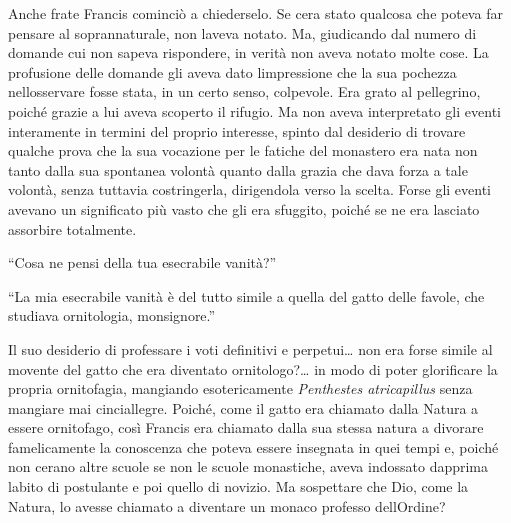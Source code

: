 Anche frate Francis cominciò a chiederselo. Se c\textquotesingle era
stato qualcosa che poteva far pensare al soprannaturale, non
l\textquotesingle aveva notato. Ma, giudicando dal numero di domande cui
non sapeva rispondere, in verità non aveva notato molte cose. La
profusione delle domande gli aveva dato l\textquotesingle impressione
che la sua pochezza nell\textquotesingle osservare fosse stata, in un
certo senso, colpevole. Era grato al pellegrino, poiché grazie a lui
aveva scoperto il rifugio. Ma non aveva interpretato gli eventi
interamente in termini del proprio interesse, spinto dal desiderio di
trovare qualche prova che la sua vocazione per le fatiche del monastero
era nata non tanto dalla sua spontanea volontà quanto dalla grazia che
dava forza a tale volontà, senza tuttavia costringerla, dirigendola
verso la scelta. Forse gli eventi avevano un significato più vasto che
gli era sfuggito, poiché se ne era lasciato assorbire totalmente.

``Cosa ne pensi della tua esecrabile vanità?''

``La mia esecrabile vanità è del tutto simile a quella del gatto delle
favole, che studiava ornitologia, monsignore.''

Il suo desiderio di professare i voti definitivi e perpetui\ldots{} non
era forse simile al movente del gatto che era diventato
ornitologo?\ldots{} in modo di poter glorificare la propria ornitofagia,
mangiando esotericamente \emph{Penthestes atricapillus} senza mangiare
mai cinciallegre. Poiché, come il gatto era chiamato dalla Natura a
essere ornitofago, così Francis era chiamato dalla sua stessa natura a
divorare famelicamente la conoscenza che poteva essere insegnata in quei
tempi e, poiché non c\textquotesingle erano altre scuole se non le
scuole monastiche, aveva indossato dapprima l\textquotesingle abito di
postulante e poi quello di novizio. Ma sospettare che Dio, come la
Natura, lo avesse chiamato a diventare un monaco professo
dell\textquotesingle Ordine?

